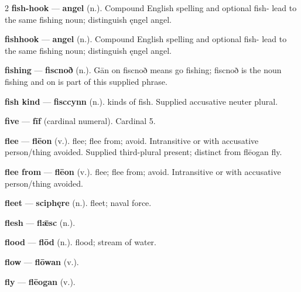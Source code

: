 \begin{multicols}{2}
\textbf{fish-hook} — \textbf{angel} (n.). Compound English spelling and optional fish- lead to the same fishing noun; distinguish ęngel angel.\par
\textbf{fishhook} — \textbf{angel} (n.). Compound English spelling and optional fish- lead to the same fishing noun; distinguish ęngel angel.\par
\textbf{fishing} — \textbf{fiscnoð} (n.).  Gān on fiscnoð means go fishing; fiscnoð is the noun fishing and on is part of this supplied phrase.\par
\textbf{fish kind} — \textbf{fisccynn} (n.). kinds of fish. Supplied accusative neuter plural.\par
\textbf{five} — \textbf{fīf} (cardinal numeral). Cardinal 5.\par
\textbf{flee} — \textbf{flēon} (v.). flee; flee from; avoid. Intransitive or with accusative person/thing avoided. Supplied third-plural present; distinct from flēogan fly.\par
\textbf{flee from} — \textbf{flēon} (v.). flee; flee from; avoid. Intransitive or with accusative person/thing avoided.\par
\textbf{fleet} — \textbf{sciphęre} (n.). fleet; naval force.\par
\textbf{flesh} — \textbf{flǣsc} (n.).\par
\textbf{flood} — \textbf{flōd} (n.). flood; stream of water.\par
\textbf{flow} — \textbf{flōwan} (v.).\par
\textbf{fly} — \textbf{flēogan} (v.).\par

\end{multicols}
